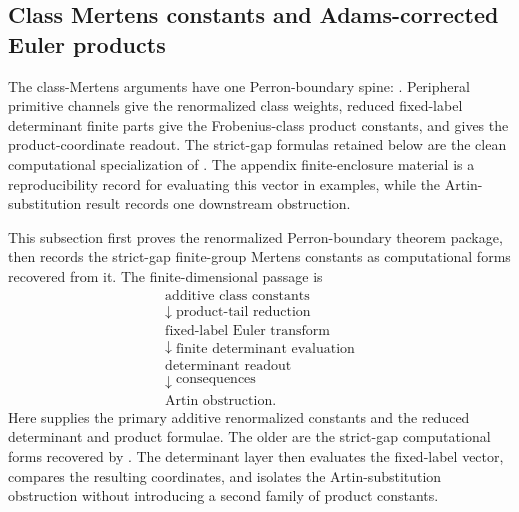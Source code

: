 \subsection{Class Mertens constants and Adams-corrected Euler products}
\label{subsec:class-mertens-adams-products}

The class-Mertens arguments have one Perron-boundary spine:
.  Peripheral primitive
channels give the renormalized class weights, reduced fixed-label determinant
finite parts give the Frobenius-class product constants, and
 gives the product-coordinate
readout.  The strict-gap formulas retained below are the clean computational
specialization of .  The appendix
finite-enclosure material is a reproducibility record for evaluating this
vector in examples, while the Artin-substitution result records one
downstream obstruction.

This subsection first proves the renormalized Perron-boundary theorem package,
then records the strict-gap finite-group Mertens constants as computational
forms recovered from it.  The finite-dimensional passage is
\[
\begin{array}{c}
  \text{additive class constants}\\
  \downarrow\;\text{product-tail reduction}\\
  \text{fixed-label Euler transform}\\
  \downarrow\;\text{finite determinant evaluation}\\
  \text{determinant readout}\\
  \downarrow\;\text{consequences}\\
  \text{Artin obstruction}.
\end{array}
\]
Here  supplies the primary
additive renormalized constants and the reduced determinant and product
formulae.  The older
are the strict-gap computational forms recovered by
.  The determinant layer then evaluates the fixed-label vector,
compares the resulting coordinates, and isolates the Artin-substitution
obstruction without introducing a second family of product constants.


